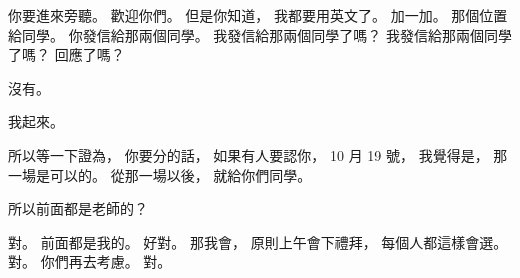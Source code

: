\hypertarget{w01:cue:718}{}你要進來旁聽。
\hypertarget{w01:cue:719}{}歡迎你們。
\hypertarget{w01:cue:720}{}但是你知道，
\hypertarget{w01:cue:721}{}我都要用英文了。
\hypertarget{w01:cue:722}{}加一加。
\hypertarget{w01:cue:723}{}那個位置給同學。
\hypertarget{w01:cue:724}{}你發信給那兩個同學。
\hypertarget{w01:cue:725}{}我發信給那兩個同學了嗎？
\hypertarget{w01:cue:726}{}我發信給那兩個同學了嗎？
\hypertarget{w01:cue:727}{}回應了嗎？

\hypertarget{w01:cue:728}{}沒有。

\hypertarget{w01:cue:729}{}我起來。

\hypertarget{w01:cue:730}{}所以等一下證為，
\hypertarget{w01:cue:731}{}你要分的話，
\hypertarget{w01:cue:732}{}如果有人要認你，
\hypertarget{w01:cue:733}{}10 月 19 號，
\hypertarget{w01:cue:734}{}我覺得是，
\hypertarget{w01:cue:735}{}那一場是可以的。
\hypertarget{w01:cue:736}{}從那一場以後，
\hypertarget{w01:cue:737}{}就給你們同學。

\hypertarget{w01:cue:738}{}所以前面都是老師的？

\hypertarget{w01:cue:739}{}對。
\hypertarget{w01:cue:740}{}前面都是我的。
\hypertarget{w01:cue:741}{}好對。
\hypertarget{w01:cue:742}{}那我會，
\hypertarget{w01:cue:743}{}原則上午會下禮拜，
\hypertarget{w01:cue:744}{}每個人都這樣會選。
\hypertarget{w01:cue:745}{}對。
\hypertarget{w01:cue:746}{}你們再去考慮。
\hypertarget{w01:cue:747}{}對。

